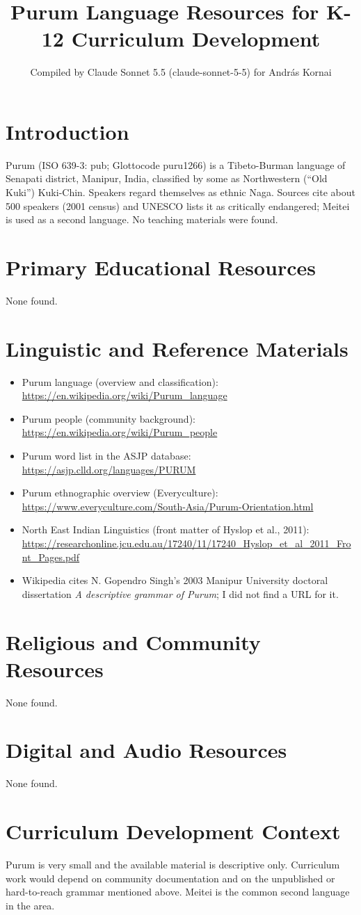 \documentclass[12pt]{article}
\title{Purum Language Resources for K-12 Curriculum Development}
\author{Compiled by Claude Sonnet 5.5 (claude-sonnet-5-5) for Andr\'as Kornai}
\date{}
\begin{document}
\maketitle

\section{Introduction}
Purum (ISO 639-3: pub; Glottocode puru1266) is a Tibeto-Burman language of Senapati district, Manipur, India, classified by some as Northwestern (``Old Kuki'') Kuki-Chin. Speakers regard themselves as ethnic Naga. Sources cite about 500 speakers (2001 census) and UNESCO lists it as critically endangered; Meitei is used as a second language. No teaching materials were found.

\section{Primary Educational Resources}
None found.

\section{Linguistic and Reference Materials}
\begin{itemize}
\item Purum language (overview and classification): \url{https://en.wikipedia.org/wiki/Purum_language}
\item Purum people (community background): \url{https://en.wikipedia.org/wiki/Purum_people}
\item Purum word list in the ASJP database: \url{https://asjp.clld.org/languages/PURUM}
\item Purum ethnographic overview (Everyculture): \url{https://www.everyculture.com/South-Asia/Purum-Orientation.html}
\item North East Indian Linguistics (front matter of Hyslop et al., 2011): \url{https://researchonline.jcu.edu.au/17240/11/17240_Hyslop_et_al_2011_Front_Pages.pdf}
\item Wikipedia cites N. Gopendro Singh's 2003 Manipur University doctoral dissertation \emph{A descriptive grammar of Purum}; I did not find a URL for it.
\end{itemize}

\section{Religious and Community Resources}
None found.

\section{Digital and Audio Resources}
None found.

\section{Curriculum Development Context}
Purum is very small and the available material is descriptive only. Curriculum work would depend on community documentation and on the unpublished or hard-to-reach grammar mentioned above. Meitei is the common second language in the area.
\end{document}
